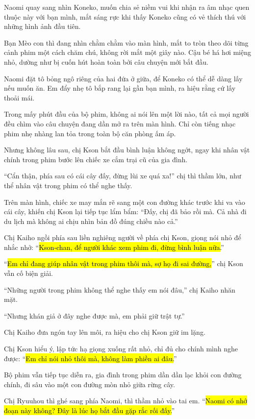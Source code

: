 \documentclass[../main.tex]{subfiles}
\begin{document}
Naomi quay sang nhìn Koneko, muốn chia sẻ niềm vui khi nhận ra âm nhạc quen thuộc này với bạn mình, mắt sáng rực khi thấy Koneko cũng có vẻ thích thú với những hình ảnh đầu tiên.

Bạn Mèo con thì đang nhìn chằm chằm vào màn hình, mắt to tròn theo dõi từng cảnh phim một cách chăm chú, không rời mắt một giây nào. Cậu bé há hơi miệng nhỏ, dường như bị cuốn hút hoàn toàn bởi câu chuyện mới bắt đầu.

Naomi đặt tô bỏng ngô riêng của hai đứa ở giữa, để Koneko có thể dễ dàng lấy nếu muốn ăn. Em đẩy nhẹ tô bắp rang lại gần bạn mình, ra hiệu rằng cứ lấy thoải mái.

Trong mấy phút đầu của bộ phim, không ai nói lên một lời nào, tất cả mọi người đều chìm vào câu chuyện đang dần mở ra trên màn hình. Chỉ còn tiếng nhạc phim nhẹ nhàng lan tỏa trong toàn bộ căn phòng ấm áp.

\ct

Nhưng không lâu sau, chị Kson bắt đầu bình luận không ngớt, ngay khi nhân vật chính trong phim bước lên chiếc xe cắm trại cũ của gia đình.

``Cẩn thận, phía sau có cái cây đấy, đừng lùi xe quá xa!'' chị thì thầm lớn, như thể nhân vật trong phim có thể nghe thấy.

Trên màn hình, chiếc xe may mắn rẽ sang một con đường khác trước khi va vào cái cây, khiến chị Kson lại tiếp tục lẩm bẩm: ``Đấy, chị đã bảo rồi mà. Cả nhà đi du lịch mà không ai chịu nhìn bản đồ đúng chiều nào cả.''

Chị Kaiho ngồi phía sau liền nghiêng người về phía chị Kson, giọng nói nhỏ để nhắc nhở: ``\hl{Kson-chan, để người khác xem phim đi, đừng bình luận nữa.}''

``\hl{Em chỉ đang giúp nhân vật trong phim thôi mà, sợ họ đi sai đường,}'' chị Kson vẫn cố biện giải.

``Những người trong phim không thể nghe thấy em nói đâu,'' chị Kaiho nhăn mặt.

``Nhưng khán giả ở đây nghe được mà, em phải giữ trật tự.''

Chị Kaiho đưa ngón tay lên môi, ra hiệu cho chị Kson giữ im lặng.

Chị Kson hiểu ý, lập tức hạ giọng xuống rất nhỏ, chỉ đủ cho chính mình nghe được: ``\hl{Em chỉ nói nhỏ thôi mà, không làm phiền ai đâu.}''

Bộ phim vẫn tiếp tục diễn ra, gia đình trong phim dần dần lạc khỏi con đường chính, đi sâu vào một con đường mòn nhỏ giữa rừng cây.

Chị Ryuuhou thì ghé sang phía Naomi, thì thầm nhỏ vào tai em. ``\hl{Naomi có nhớ đoạn này không? Đây là lúc họ bắt đầu gặp rắc rối đấy.}''
\end{document}
